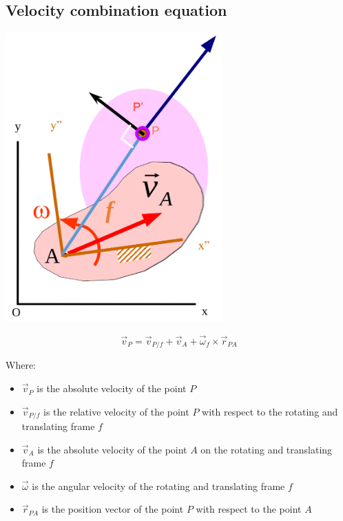 \documentclass[11pt]{article}
\begin{document}
\subsection{Velocity combination equation}
\label{sec:orga251eb0}
\begin{center}
\includegraphics[height=30em]{./images/velocity-combination-equation-diagram.png}
\end{center}

\[\vec{v}_P = \vec{v}_{P/f} + \vec{v}_A + \vec{\omega}_f \times \vec{r}_{PA}\]

Where:
\begin{itemize}
\item \(\vec{v}_P\) is the absolute velocity of the point \(P\)
\item \(\vec{v}_{P/f}\) is the relative velocity of the point \(P\) with respect to the rotating and translating frame \(f\)
\item \(\vec{v}_A\) is the absolute velocity of the point \(A\) on the rotating and translating frame \(f\)
\item \(\vec{\omega}\) is the angular velocity of the rotating and translating frame \(f\)
\item \(\vec{r}_{PA}\) is the position vector of the point \(P\) with respect to the point \(A\)
\end{itemize}
\end{document}

